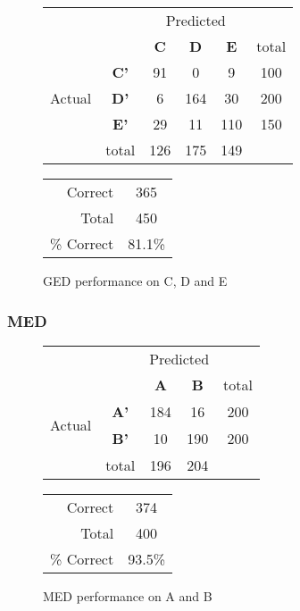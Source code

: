 \begin{figure}[!ht]
\begin{minipage}[b]{0.5\linewidth}
\centering
	\begin{tabular}{ccc|c|c|c}
	 & &\multicolumn{3}{c}{Predicted} &\\
	  & & \bf{C} &  \bf{D} & \bf{E} & total \\
	 \cline{3-6}
	 \multirow{3}{*}{\begin{sideways}Actual\end{sideways}} & \bf{C'}& 91 & 0 & 9 & 100\\
	 \cline{3-6}
	 & \bf{D'}& 6 & 164 & 30 & 200\\
	  \cline{3-6}
	 & \bf{E'}& 29 & 11 & 110 &  150\\
	  \cline{3-6}
	 &total&126&175&149\\
	\end{tabular}
\end{minipage}
\hspace{0.5cm}
\begin{minipage}[b]{0.5\linewidth}
	\begin{tabular}{r|c}
	\hline
	Correct& 365\\
	Total& 450\\
	\hline
	\% Correct& 81.1\%\\
	\hline
	\end{tabular}
\end{minipage}
\vspace{1mm}
\caption{GED performance on C, D and E}
\end{figure}


\subsubsection{MED}
\begin{figure}[!ht]
\begin{minipage}[b]{0.5\linewidth}
\centering
	\begin{tabular}{ccc|c|c}
	 & &\multicolumn{2}{c}{Predicted} &\\
	  & & \bf{A} &  \bf{B} & total \\
	 \cline{3-5}
	 \multirow{2}{*}{\begin{sideways}Actual\end{sideways}} & \bf{A'}& 184 & 16 & 200 \\
	 \cline{3-5}
	 & \bf{B'}& 10 & 190 & 200 \\
	  \cline{3-5}
	 &total&196&204&\\
	\end{tabular}
\end{minipage}
\hspace{0.5cm}
\begin{minipage}[b]{0.5\linewidth}
	\begin{tabular}{r|c}
	\hline
	Correct& 374\\
	Total& 400\\
	\hline
	\% Correct& 93.5\%\\
	\hline
	\end{tabular}
\end{minipage}
\vspace{1mm}
\caption{MED performance on A and B}
\end{figure}


